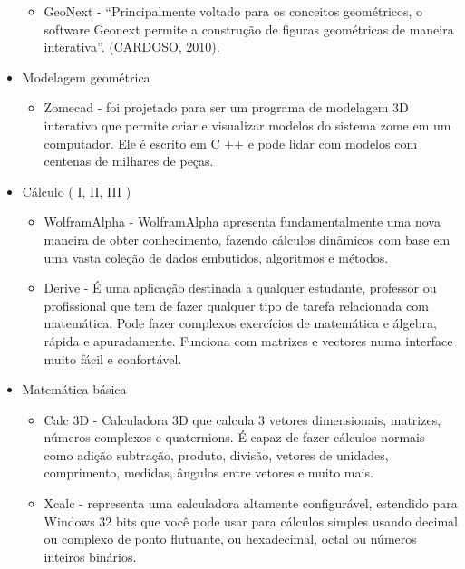 \documentclass[12pt,a4paper]{article}
\begin{document}
\begin{itemize}
\begin{itemize}
\item GeoNext - “Principalmente voltado para os conceitos geométricos, o software Geonext permite a construção de figuras geométricas de maneira interativa”. (CARDOSO, 2010).

\end{itemize}

\item Modelagem geométrica 

\begin{itemize}
\item Zomecad - foi projetado para ser um programa de modelagem 3D interativo que permite criar e visualizar modelos do sistema zome em um computador. Ele é escrito em C ++ e pode lidar com modelos com centenas de milhares de peças.

\end{itemize}

\item Cálculo ( I, II, III )

\begin{itemize}
\item  WolframAlpha - WolframAlpha apresenta fundamentalmente uma nova maneira de obter conhecimento, fazendo cálculos dinâmicos com base em uma vasta coleção de dados embutidos, algoritmos e métodos.


\item Derive - É uma aplicação destinada a qualquer estudante, professor ou profissional que tem de fazer qualquer tipo de tarefa relacionada com matemática. Pode fazer complexos exercícios de matemática e álgebra, rápida e apuradamente. Funciona com matrizes e vectores numa interface muito fácil e confortável.
\end{itemize}

\item Matemática básica

\begin{itemize}
\item  Calc 3D -  Calculadora 3D que calcula 3 vetores dimensionais, matrizes, números complexos e quaternions. É capaz de fazer cálculos normais como adição subtração, produto, divisão, vetores de unidades, comprimento, medidas, ângulos entre vetores e muito mais.


\item Xcalc - representa uma calculadora altamente configurável, estendido para Windows 32 bits que você pode usar para cálculos simples usando decimal ou complexo de ponto flutuante, ou hexadecimal, octal ou números inteiros binários.
\end{itemize}


\end{itemize}
\end{document}
